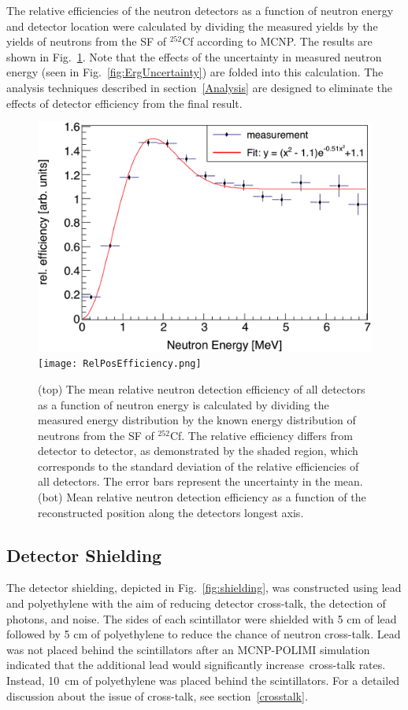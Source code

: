 The relative efficiencies of the neutron detectors as a function of neutron energy and detector location were calculated by dividing the measured yields by the yields of neutrons from the SF of $^{252}$Cf according to MCNP.
The results are shown in Fig.~\ref{fig:RelErgEfficiency}.
Note that the effects of the uncertainty in measured neutron energy (seen in Fig.~\ref{fig:ErgUncertainty}) are folded into this calculation.
The analysis techniques described in section~\ref{Analysis} are designed to eliminate the effects of detector efficiency from the final result.
\begin{figure}[]
    \centering
    \includegraphics[width = \figsize\textwidth]{RelErgEfficiency.png}
     \texttt{[image: RelPosEfficiency.png]}
     
       \caption{(top) The mean relative neutron detection efficiency of all detectors as a function of neutron energy is calculated by dividing the measured energy distribution by the known energy distribution of neutrons from the SF of $^{252}$Cf. The relative efficiency differs from detector to detector, as demonstrated by the shaded region, which corresponds to the standard deviation of the relative efficiencies of all detectors. The error bars represent the uncertainty in the mean. (bot) Mean relative neutron detection efficiency as a function of the reconstructed position along the detectors longest axis. }
    \label{fig:RelErgEfficiency}
\end{figure}

\subsection{Detector Shielding}
\label{shielding}
The detector shielding, depicted in Fig.~\ref{fig:shielding}, was constructed using lead and polyethylene with the aim of reducing detector cross-talk, the detection of photons, and noise.
The sides of each scintillator were shielded with 5 cm of lead followed by 5 cm of polyethylene to reduce the chance of neutron cross-talk.
Lead was not placed behind the scintillators after an MCNP-POLIMI simulation indicated that the additional lead would significantly increase cross-talk rates.
Instead, 10~cm of polyethylene was placed behind the scintillators.
For a detailed discussion about the issue of cross-talk, see section~\ref{crosstalk}.

